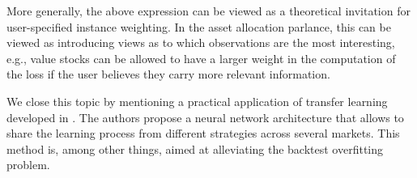 More generally, the above expression can be viewed as a theoretical invitation for user-specified instance weighting. In the asset allocation parlance, this can be viewed as introducing views as to which observations are the most interesting, e.g., value stocks can be allowed to have a larger weight in the computation of the loss if the user believes they carry more relevant information.

We close this topic by mentioning a practical application of transfer learning developed in \cite{koshiyama2020quantnet}. The authors propose a neural network architecture that allows to share the learning process from different strategies across several markets. This method is, among other things, aimed at alleviating the backtest overfitting problem.